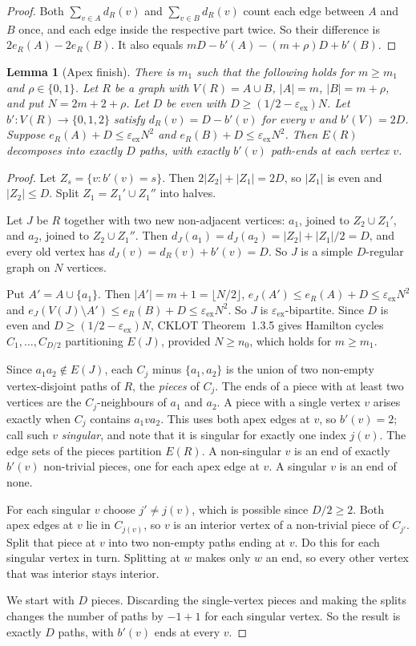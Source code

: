 \documentclass[11pt]{article}
\newtheorem{lemma}[theorem]{Lemma}
\theoremstyle{definition}
\newcommand{\eps}{\varepsilon}
\newcommand{\epsex}{\eps_{\mathrm{ex}}}
\begin{document}
\begin{proof}
Both $\sum_{v\in A}d_R(v)$ and $\sum_{v\in B}d_R(v)$ count each edge between $A$ and $B$ once, and each edge inside the respective part twice. So their difference is $2e_R(A)-2e_R(B)$. It also equals $mD-b'(A)-(m+\rho)D+b'(B)$.
\end{proof}

\begin{lemma}[Apex finish]\label{lem:apex}
There is $m_1$ such that the following holds for $m\ge m_1$ and $\rho\in\{0,1\}$. Let $R$ be a graph with $V(R)=A\cup B$, $|A|=m$, $|B|=m+\rho$, and put $N=2m+2+\rho$. Let $D$ be even with $D\ge(1/2-\epsex)N$. Let $b':V(R)\to\{0,1,2\}$ satisfy $d_R(v)=D-b'(v)$ for every $v$ and $b'(V)=2D$. Suppose $e_R(A)+D\le\epsex N^2$ and $e_R(B)+D\le\epsex N^2$. Then $E(R)$ decomposes into exactly $D$ paths, with exactly $b'(v)$ path-ends at each vertex $v$.
\end{lemma}

\begin{proof}
Let $Z_s=\{v:b'(v)=s\}$. Then $2|Z_2|+|Z_1|=2D$, so $|Z_1|$ is even and $|Z_2|\le D$. Split $Z_1=Z_1'\cup Z_1''$ into halves.

Let $J$ be $R$ together with two new non-adjacent vertices: $a_1$, joined to $Z_2\cup Z_1'$, and $a_2$, joined to $Z_2\cup Z_1''$. Then $d_J(a_1)=d_J(a_2)=|Z_2|+|Z_1|/2=D$, and every old vertex has $d_J(v)=d_R(v)+b'(v)=D$. So $J$ is a simple $D$-regular graph on $N$ vertices.

Put $A'=A\cup\{a_1\}$. Then $|A'|=m+1=\lfloor N/2\rfloor$, $e_J(A')\le e_R(A)+D\le\epsex N^2$ and $e_J(V(J)\setminus A')\le e_R(B)+D\le\epsex N^2$. So $J$ is $\epsex$-bipartite. Since $D$ is even and $D\ge(1/2-\epsex)N$, CKLOT Theorem~1.3.5 gives Hamilton cycles $C_1,\dots,C_{D/2}$ partitioning $E(J)$, provided $N\ge n_0$, which holds for $m\ge m_1$.

Since $a_1a_2\notin E(J)$, each $C_j$ minus $\{a_1,a_2\}$ is the union of two non-empty vertex-disjoint paths of $R$, the \emph{pieces} of $C_j$. The ends of a piece with at least two vertices are the $C_j$-neighbours of $a_1$ and $a_2$. A piece with a single vertex $v$ arises exactly when $C_j$ contains $a_1va_2$. This uses both apex edges at $v$, so $b'(v)=2$; call such $v$ \emph{singular}, and note that it is singular for exactly one index $j(v)$. The edge sets of the pieces partition $E(R)$. A non-singular $v$ is an end of exactly $b'(v)$ non-trivial pieces, one for each apex edge at $v$. A singular $v$ is an end of none.

For each singular $v$ choose $j'\neq j(v)$, which is possible since $D/2\ge2$. Both apex edges at $v$ lie in $C_{j(v)}$, so $v$ is an interior vertex of a non-trivial piece of $C_{j'}$. Split that piece at $v$ into two non-empty paths ending at $v$. Do this for each singular vertex in turn. Splitting at $w$ makes only $w$ an end, so every other vertex that was interior stays interior.

We start with $D$ pieces. Discarding the single-vertex pieces and making the splits changes the number of paths by $-1+1$ for each singular vertex. So the result is exactly $D$ paths, with $b'(v)$ ends at every $v$.
\end{proof}
\end{document}

